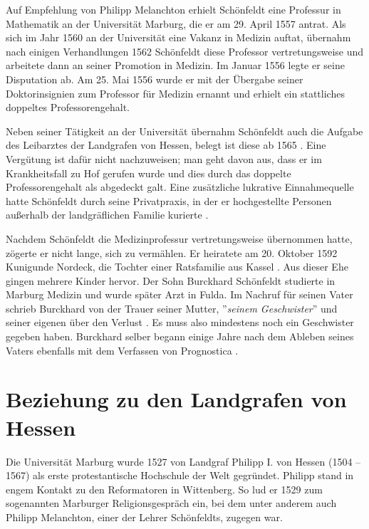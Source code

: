 \documentclass[12pt]{article}
\begin{document}
Auf Empfehlung von Philipp Melanchton erhielt Schönfeldt eine Professur in Mathematik an der Universität Marburg, die er am 29. April 1557 antrat. Als sich im Jahr 1560 an der Universität eine Vakanz in Medizin auftat, übernahm nach einigen Verhandlungen 1562 Schönfeldt diese Professor vertretungsweise und arbeitete dann an seiner Promotion in Medizin. Im Januar 1556 legte er seine Disputation ab. Am 25. Mai 1556 wurde er mit der Übergabe seiner Doktorinsignien zum Professor für Medizin ernannt \cite{Caesar1877} und erhielt ein stattliches doppeltes Professorengehalt. 

Neben seiner Tätigkeit an der Universität übernahm Schönfeldt auch die Aufgabe des Leibarztes der Landgrafen von Hessen, belegt ist diese ab 1565 \cite{Saloch2006}. Eine Vergütung ist dafür nicht nachzuweisen; man geht davon aus, dass er im Krankheitsfall zu Hof gerufen wurde und dies durch das doppelte Professorengehalt als abgedeckt galt. Eine zusätzliche lukrative Einnahmequelle hatte Schönfeldt durch seine Privatpraxis, in der er hochgestellte Personen außerhalb der landgräflichen Familie kurierte \cite{Schmitz1978}.

Nachdem Schönfeldt die Medizinprofessur vertretungsweise übernommen hatte, zögerte er nicht lange, sich zu vermählen. Er heiratete am 20. Oktober 1592 Kunigunde Nordeck, die Tochter einer Ratsfamilie aus Kassel \cite{Bechstein1875}. Aus dieser Ehe gingen mehrere Kinder hervor. Der Sohn Burckhard Schönfeldt studierte in Marburg Medizin und wurde später Arzt in Fulda. 
Im Nachruf für seinen Vater schrieb Burckhard 
von der Trauer seiner Mutter, ''\emph{seinem Geschwister}'' und seiner eigenen über den Verlust \cite{Schoenfeldt1591a}. Es muss also mindestens noch ein Geschwister gegeben haben. Burckhard selber begann einige Jahre nach dem Ableben seines Vaters ebenfalls mit dem Verfassen von Prognostica \cite{Herbst2014}.

\section{Beziehung zu den Landgrafen von Hessen}

Die Universität Marburg wurde 1527 von Landgraf Philipp I. von Hessen (1504 -- 1567) als erste protestantische Hochschule der Welt gegründet.
Philipp stand in engem Kontakt zu den Reformatoren in Wittenberg. So lud er 1529 zum sogenannten Marburger Religionsgespräch ein, bei dem unter anderem auch Philipp Melanchton, einer der Lehrer Schönfeldts, zugegen war.
\end{document}
